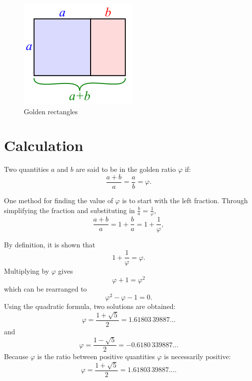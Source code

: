 \begin{figure}[hbt!]\centering
\includegraphics[width=.3\textwidth]{SimilarGoldenRectangles}
\caption{Golden rectangles}
\end{figure}



\section{Calculation}
Two quantities $a$ and $b$ are said to be in the golden ratio $\varphi$ if:
\begin{equation}
 \frac{a+b}{a} = \frac{a}{b} = \varphi.
\end{equation}

One method for finding the value of $\varphi$ is to start with the left fraction. Through simplifying the fraction and substituting in $\frac{b}{a} = \frac{1}{\varphi}$,
\begin{equation}
\frac{a+b}{a} = 1 + \frac{b}{a} = 1 + \frac{1}{\varphi},
\end{equation}

By definition, it is shown that
\begin{equation}
 1 + \frac{1}{\varphi} = \varphi. 
\end{equation}
Multiplying by $\varphi$ gives
\begin{equation*}
\varphi + 1 = \varphi^2
\end{equation*}
which can be rearranged to
\begin{equation*}
{\varphi}^2 - \varphi - 1 = 0.
\end{equation*}
Using the quadratic formula, two solutions are obtained:
\begin{equation*}
\varphi = \frac{1 + \sqrt{5}}{2} = 1.61803\,39887\dots
\end{equation*}
and
\begin{equation*}
\varphi = \frac{1 - \sqrt{5}}{2} = -0.6180\,339887\dots
\end{equation*}
Because $\varphi$ is the ratio between positive quantities $\varphi$ is necessarily positive:
\begin{equation*}
\varphi = \frac{1 + \sqrt{5}}{2} = 1.61803\,39887\dots .
\end{equation*}


